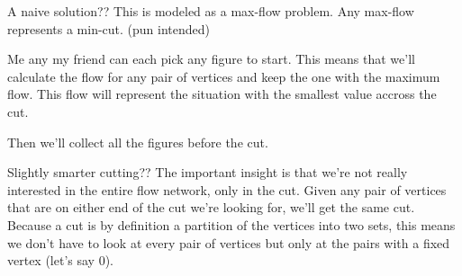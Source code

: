 \documentclass{writeup}
\begin{document}
\begin{solutions}
  \begin{solution}{A naive solution}{?}{?}
    This is modeled as a max-flow problem.
    Any max-flow represents a min-cut. (pun intended)

    Me any my friend can each pick any figure to start.
    This means that we'll calculate the flow for any pair of vertices and keep the one with the maximum flow.
    This flow will represent the situation with the smallest value accross the cut.


    Then we'll collect all the figures before the cut.


  \end{solution}

  \begin{solution}{Slightly smarter cutting}{?}{?}
    The important insight is that we're not really interested in the entire flow network, only in the cut.
    Given any pair of vertices that are on either end of the cut we're looking for, we'll get the same cut.
    Because a cut is by definition a partition of the vertices into two sets, this means we don't have to look at every pair of vertices but only at the pairs with a fixed vertex (let's say $0$).
    
  \end{solution}
\end{solutions}
\end{document}
